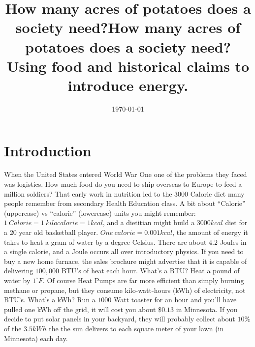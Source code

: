 \documentclass[man]{apa7}
\begin{document}
\title{How many acres of potatoes does a society need?} 
\leftheader{}
\title{How many acres of potatoes does a society need? Using food and historical claims to introduce energy.}
\date{\today}

\maketitle

\section{Introduction}
When the United States entered World War One one of the problems they faced was logistics.  How much food do you need to ship overseas to Europe to feed a million soldiers?  That early work in nutrition led to the $3000$ Calorie diet many people remember from secondary Health Education class.  A bit about ``Calorie'' (uppercase) vs ``calorie'' (lowercase) units you might remember: $1~Calorie = 1~kilocalorie=1 kcal$, and a dietitian might build a $3000 kcal$ diet for a 20 year old basketball player. $One~ calorie = 0.001kcal$, the amount of energy it takes  to heat a gram of water by a degree Celsius.  There are about $4.2$ Joules in a single calorie, and a Joule occurs all over introductory  physics.  If you need to buy a new home furnace, the sales brochure might advertise that it is capable of delivering $100,000$ BTU's of heat each hour.  What's a BTU? Heat a pound of water by $1^{\circ}F$.  Of course Heat Pumps are far more efficient than simply burning methane or propane, but they consume kilo-watt-hours (kWh) of electricity, not BTU's.  What's a kWh?  Run a $1000$ Watt toaster for an hour and you'll have pulled one kWh off the grid, it will cost you about $\$0.13$ in Minnesota.  If you decide to put solar panels in your backyard, they will probably collect about $10\%$ of the $3.5kWh$ the  the sun delivers to each square meter of your lawn (in Minnesota) each day.  
\end{document}
